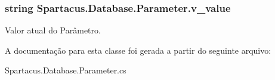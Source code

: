 \hypertarget{classSpartacus_1_1Database_1_1Parameter_a124939a3bf560bd654e83b54f94c522b}{
\subsubsection[{v\+\_\+value}]{\setlength{\rightskip}{0pt plus 5cm}string Spartacus.\+Database.\+Parameter.\+v\+\_\+value}}\label{classSpartacus_1_1Database_1_1Parameter_a124939a3bf560bd654e83b54f94c522b}


Valor atual do Parâmetro. 



A documentação para esta classe foi gerada a partir do seguinte arquivo\+:\begin{DoxyCompactItemize}
\item 
Spartacus.\+Database.\+Parameter.\+cs\end{DoxyCompactItemize}
